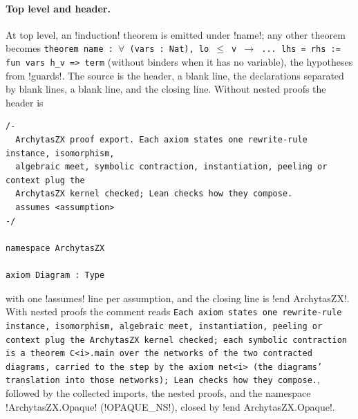 \paragraph{Top level and header.} At top level, an \code!induction! theorem is emitted under \code!name!; any other theorem becomes \texttt{theorem name : $\forall$ (\allowbreak{}vars : Nat),\allowbreak{} lo $\le$ v $\to$ .\allowbreak{}.\allowbreak{}.\allowbreak{} lhs = rhs := fun vars h\_\allowbreak{}v => term} (without binders when it has no variable), the hypotheses from \code!guards!. The source is the header, a blank line, the declarations separated by blank lines, a blank line, and the closing line. Without nested proofs the header is
\begin{lstlisting}[style=lean]
/-
  ArchytasZX proof export. Each axiom states one rewrite-rule instance, isomorphism,
  algebraic meet, symbolic contraction, instantiation, peeling or context plug the
  ArchytasZX kernel checked; Lean checks how they compose.
  assumes <assumption>
-/

namespace ArchytasZX

axiom Diagram : Type
\end{lstlisting}
with one \code!assumes! line per assumption, and the closing line is \code!end ArchytasZX!. With nested proofs the comment reads \texttt{Each axiom states one rewrite-rule instance,\allowbreak{} isomorphism,\allowbreak{} algebraic meet,\allowbreak{} instantiation,\allowbreak{} peeling or context plug the ArchytasZX kernel checked; each symbolic contraction is a theorem C<i>.\allowbreak{}main over the networks of the two contracted diagrams,\allowbreak{} carried to the step by the axiom net<i> (\allowbreak{}the diagrams' translation into those networks); Lean checks how they compose.\allowbreak{}}, followed by the collected imports, the nested proofs, and the namespace \code!ArchytasZX.Opaque! (\py!OPAQUE_NS!), closed by \code!end ArchytasZX.Opaque!.

